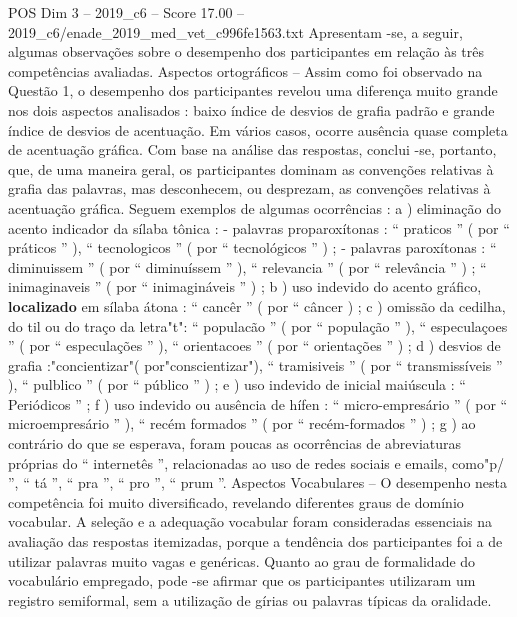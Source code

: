 \begin{textsample}{POS Dim 3 – 2019\_c6 – Score 17.00 – 2019\_c6/enade\_2019\_med\_vet\_c996fe1563.txt}
Apresentam -se, a seguir, algumas observações sobre o desempenho dos participantes em relação às três competências avaliadas.
Aspectos ortográficos – Assim como foi observado na Questão 1, o desempenho dos participantes revelou uma diferença muito grande nos dois aspectos analisados : baixo índice de desvios de grafia padrão e grande índice de desvios de acentuação.
Em vários casos, ocorre ausência quase completa de acentuação gráfica.
Com base na análise das respostas, conclui -se, portanto, que, de uma maneira geral, os participantes dominam as convenções relativas à grafia das palavras, mas desconhecem, ou desprezam, as convenções relativas à acentuação gráfica.
Seguem exemplos de algumas ocorrências : a ) eliminação do acento indicador da sílaba tônica : - palavras proparoxítonas : “ praticos ” ( por “ práticos ” ), “ tecnologicos ” ( por “ tecnológicos ” ) ; - palavras paroxítonas : “ diminuissem ” ( por “ diminuíssem ” ), “ relevancia ” ( por “ relevância ” ) ; “ inimaginaveis ” ( por “ inimagináveis ” ) ; b ) uso indevido do acento gráfico, \textbf{localizado} em sílaba átona : “ cancêr ” ( por “ câncer ) ; c ) omissão da cedilha, do til ou do traço da letra"t": “ populacão ” ( por “ população ” ), “ especulaçoes ” ( por “ especulações ” ), “ orientacoes ” ( por “ orientações ” ) ; d ) desvios de grafia :"concientizar"( por"conscientizar"), “ tramisiveis ” ( por “ transmissíveis ” ), “ pulblico ” ( por “ público ” ) ; e ) uso indevido de inicial maiúscula : “ Periódicos ” ; f ) uso indevido ou ausência de hífen : “ micro-empresário ” ( por “ microempresário ” ), “ recém formados ” ( por “ recém-formados ” ) ; g ) ao contrário do que se esperava, foram poucas as ocorrências de abreviaturas próprias do “ internetês ”, relacionadas ao uso de redes sociais e emails, como"p/ ”, “ tá ”, “ pra ”, “ pro ”, “ prum ”.
Aspectos Vocabulares – O desempenho nesta competência foi muito diversificado, revelando diferentes graus de domínio vocabular.
A seleção e a adequação vocabular foram consideradas essenciais na avaliação das respostas itemizadas, porque a tendência dos participantes foi a de utilizar palavras muito vagas e genéricas.
Quanto ao grau de formalidade do vocabulário empregado, pode -se afirmar que os participantes utilizaram um registro semiformal, sem a utilização de gírias ou palavras típicas da oralidade.

\end{textsample}
